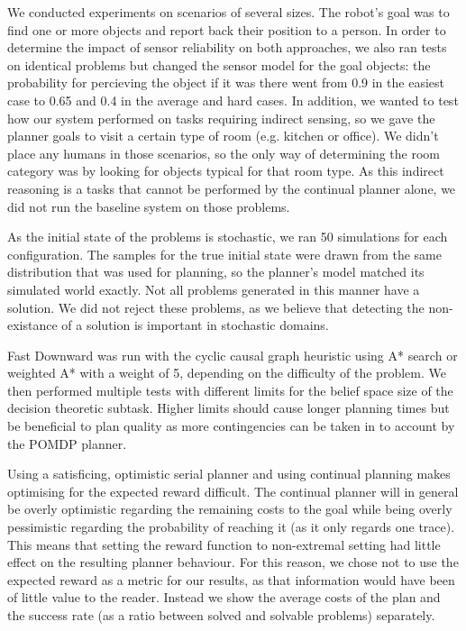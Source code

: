 We conducted experiments on scenarios of several sizes. The robot's
goal was to find one or more objects and report back their position to
a person. In order to determine the impact of sensor reliability on
both approaches, we also ran tests on identical problems but changed
the sensor model for the goal objects: the probability for percieving
the object if it was there went from 0.9 in the easiest case to 0.65
and 0.4 in the average and hard cases. In addition, we wanted to test
how our system performed on tasks requiring indirect sensing, so we
gave the planner goals to visit a certain type of room (e.g. kitchen
or office). We didn't place any humans in those scenarios, so the only
way of determining the room category was by looking for objects
typical for that room type. As this indirect reasoning is a tasks that
cannot be performed by the continual planner alone, we did not run the
baseline system on those problems.

As the initial state of the problems is stochastic, we ran 50
simulations for each configuration. The samples for the true initial
state were drawn from the same distribution that was used for
planning, so the planner's model matched its simulated world
exactly. Not all problems generated in this manner have a solution. We
did not reject these problems, as we believe that detecting the
non-existance of a solution is important in stochastic domains.


Fast Downward was run with the cyclic causal graph heuristic using A*
search or weighted A* with a weight of 5, depending on the difficulty
of the problem. We then performed multiple tests with different limits
for the belief space size of the decision theoretic subtask. Higher
limits should cause longer planning times but be beneficial to plan
quality as more contingencies can be taken in to account by the POMDP
planner.

Using a satisficing, optimistic serial planner and using continual
planning makes optimising for the expected reward difficult. The
continual planner will in general be overly optimistic regarding the
remaining costs to the goal while being overly pessimistic regarding
the probability of reaching it (as it only regards one trace). This
means that setting the reward function to non-extremal setting had
little effect on the resulting planner behaviour. For this reason, we
chose not to use the expected reward as a metric for our results, as
that information would have been of little value to the
reader. Instead we show the average costs of the plan and the success
rate (as a ratio between solved and solvable problems) separately.

